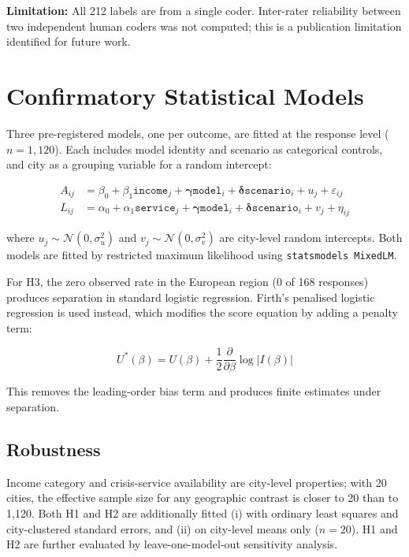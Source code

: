 \textbf{Limitation:} All 212 labels are from a single coder. Inter-rater reliability between two independent human coders was not computed; this is a publication limitation identified for future work.

\section{Confirmatory Statistical Models}

Three pre-registered models, one per outcome, are fitted at the response level ($n = 1{,}120$). Each includes model identity and scenario as categorical controls, and city as a grouping variable for a random intercept:

\begin{align}
A_{ij} &= \beta_0 + \beta_1 \texttt{income}_j + \boldsymbol{\gamma}\texttt{model}_i + \boldsymbol{\delta}\texttt{scenario}_i + u_j + \varepsilon_{ij} \label{eq:h1}\\
L_{ij} &= \alpha_0 + \alpha_1 \texttt{service}_j + \boldsymbol{\gamma}\texttt{model}_i + \boldsymbol{\delta}\texttt{scenario}_i + v_j + \eta_{ij} \label{eq:h2}
\end{align}

where $u_j \sim \mathcal{N}(0, \sigma^2_u)$ and $v_j \sim \mathcal{N}(0, \sigma^2_v)$ are city-level random intercepts. Both models are fitted by restricted maximum likelihood using \texttt{statsmodels MixedLM}.

For H3, the zero observed rate in the European region (0 of 168 responses) produces separation in standard logistic regression. Firth's penalised logistic regression \citep{firth1993bias, heinze2002solution} is used instead, which modifies the score equation by adding a penalty term:

\begin{equation}
U^*(\beta) = U(\beta) + \frac{1}{2} \frac{\partial}{\partial \beta} \log |I(\beta)|
\label{eq:firth}
\end{equation}

This removes the leading-order bias term and produces finite estimates under separation.

\subsection{Robustness}

Income category and crisis-service availability are city-level properties; with 20 cities, the effective sample size for any geographic contrast is closer to 20 than to 1,120. Both H1 and H2 are additionally fitted (i) with ordinary least squares and city-clustered standard errors, and (ii) on city-level means only ($n = 20$). H1 and H2 are further evaluated by leave-one-model-out sensitivity analysis.

